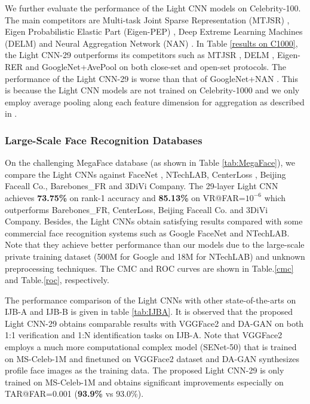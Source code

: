 \documentclass[journal,transmag]{IEEEtran}
\begin{document}
We further evaluate the performance of the Light CNN models on Celebrity-100. The main competitors are Multi-task Joint Sparse Representation (MTJSR) \cite{DBLP:journals/tip/YuanLY12}, Eigen Probabilistic Elastic Part (Eigen-PEP) \cite{DBLP:conf/accv/LiHSLB14}, Deep Extreme Learning Machines (DELM) \cite{DBLP:journals/corr/UzairSGM15} and Neural Aggregation Network (NAN) \cite{yang2017neural}.
In Table \ref{results on C1000}, the Light CNN-29 outperforms its competitors such as MTJSR \cite{DBLP:journals/tip/YuanLY12}, DELM \cite{DBLP:journals/corr/UzairSGM15}, Eigen-RER \cite{DBLP:conf/accv/LiHSLB14} and GoogleNet+AvePool \cite{yang2017neural} on both close-set and open-set protocols. The performance of the Light CNN-29 is worse than that of GoogleNet+NAN \cite{yang2017neural}. This is because the Light CNN models are not trained on Celebrity-1000 and we only employ average pooling along each feature dimension for aggregation as described in \cite{yang2017neural}.


\subsubsection{Large-Scale Face Recognition Databases}
On the challenging MegaFace database (as shown in Table \ref{tab:MegaFace}), we compare the Light CNNs against FaceNet \cite{schroff2015facenet}, NTechLAB, CenterLoss \cite{wen2016discriminative}, Beijing Faceall Co., Barebones\_FR and 3DiVi Company. %
The 29-layer Light CNN achieves \textbf{73.75\%} on rank-1 accuracy and \textbf{85.13\%} on VR@FAR=$10^{-6}$ which outperforms Barebones\_FR, CenterLoss, Beijing Faceall Co. and 3DiVi Company. Besides, the Light CNNs obtain satisfying results compared with some commercial face recognition systems such as Google FaceNet and NTechLAB. Note that they achieve better performance than our models due to the large-scale private training dataset (500M for Google and 18M for NTechLAB) and unknown preprocessing techniques. The CMC and ROC curves are shown in Table.\ref{cmc} and Table.\ref{roc}, respectively.

The performance comparison of the Light CNNs with other state-of-the-arts on IJB-A and IJB-B is given in table \ref{tab:IJBA}. It is observed that the proposed Light CNN-29 obtains comparable results with VGGFace2 \cite{DBLP:journals/corr/abs-1710-08092} and DA-GAN \cite{zhao2017dual} on both 1:1 verification and 1:N identification tasks on IJB-A. Note that VGGFace2 employs a much more computational complex model (SENet-50) that is trained on MS-Celeb-1M and finetuned on VGGFace2 dataset and DA-GAN synthesizes profile face images as the training data. The proposed Light CNN-29 is only trained on MS-Celeb-1M and obtains significant improvements especially on TAR@FAR=0.001 (\textbf{93.9\%} vs 93.0\%).
\end{document}
